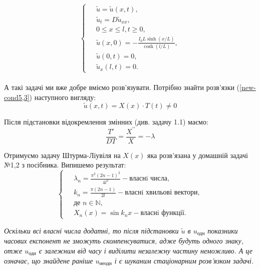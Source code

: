 \begin{equation} \label{new-cond5,3}
    \left\{ \begin{aligned}
            \;&\tilde{u} = \tilde{u}(x,t), \\
            &\tilde{u}_t = D \tilde{u}_{xx}, \\
            &0 \leq x \leq l, t \geq 0, \\
            &\tilde{u}(x,0) = -\frac{I_0L \sinh(x/L)}{\cosh(l/L)},\\
            &\tilde{u}(0,t) = 0, \\
            &\tilde{u}_x(l,t) = 0. 
    \end{aligned} \right.
\end{equation}
\\

А такі задачі ми вже добре вміємо розв'язувати. Потрібно знайти розв'язки (\ref{new-cond5,3})
наступного вигляду:
\begin{equation} \label{subst5,3}
    \tilde{u}(x,t) = X(x) \cdot T(t) \neq 0 
\end{equation}

Після підстановки відокремлення змінних (див. задачу 1.1) маємо:
\begin{equation}
    \frac{T'}{DT} = \frac{X^{\prime\prime}}{X} = -\lambda
\end{equation}

Отримуємо задачу Штурма-Ліувіля на $X(x)$ яка розв'язана у домашній задачі №1,2 з посібника. Випишемо результат:
  \begin{equation} 
        \left\{ \begin{aligned}
            \;&\lambda_n = \frac{\pi^2 (2n-1)^2}{4l^2} - \text{власнi числа},\\
            &k_n = \frac{\pi (2n-1)}{2l} - \text{власнi хвильові вектори},\\
            &\text{де } n \in \mathbb{N},\\ 
            &X_n(x) = \sin k_nx - \text{власнi функції}.
        \end{aligned} \right.
    \end{equation}

\textit{Оскільки всі власні числа додатні, то після підстановки $\tilde{u}$ в $u_{\text{одн}}$ показники часових експонент не зможуть скомпенсуватися, адже будуть одного знаку, отже $u_{\text{одн}}$ є залежним від часу і виділити незалежну частину неможливо. А це означає, що знайдене раніше $u_{\text{неодн}}$ і є шуканим стаціонарним розв'язком задачі.}

